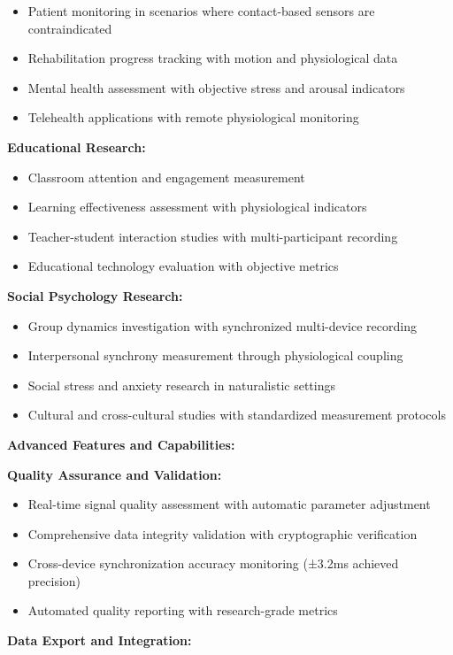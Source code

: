 \documentclass[11pt,a4paper]{article}
\begin{document}
\begin{itemize}
\item Patient monitoring in scenarios where contact-based sensors are contraindicated
\item Rehabilitation progress tracking with motion and physiological data
\item Mental health assessment with objective stress and arousal indicators
\item Telehealth applications with remote physiological monitoring

\end{itemize}
\textbf{Educational Research:}

\begin{itemize}
\item Classroom attention and engagement measurement
\item Learning effectiveness assessment with physiological indicators
\item Teacher-student interaction studies with multi-participant recording
\item Educational technology evaluation with objective metrics

\end{itemize}
\textbf{Social Psychology Research:}

\begin{itemize}
\item Group dynamics investigation with synchronized multi-device recording
\item Interpersonal synchrony measurement through physiological coupling
\item Social stress and anxiety research in naturalistic settings
\item Cultural and cross-cultural studies with standardized measurement protocols

\end{itemize}
\textbf{Advanced Features and Capabilities:}

\textbf{Quality Assurance and Validation:}

\begin{itemize}
\item Real-time signal quality assessment with automatic parameter adjustment
\item Comprehensive data integrity validation with cryptographic verification
\item Cross-device synchronization accuracy monitoring (±3.2ms achieved precision)
\item Automated quality reporting with research-grade metrics

\end{itemize}
\textbf{Data Export and Integration:}
\end{document}
